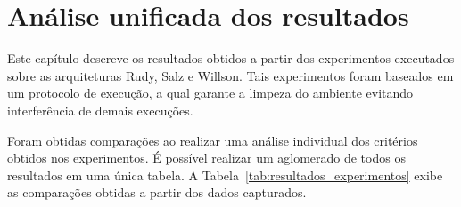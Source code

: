 \section{Análise unificada dos resultados}
\label{sec:experimentos_conc}

Este capítulo descreve os resultados obtidos a partir dos experimentos executados sobre as arquiteturas Rudy, Salz e Willson.
%
Tais experimentos foram baseados em um protocolo de execução, a qual garante a limpeza do ambiente evitando interferência de demais execuções.

Foram obtidas comparações ao realizar uma análise individual dos critérios obtidos nos experimentos.
%
É possível realizar um aglomerado de todos os resultados em uma única tabela.
%
A Tabela~\ref{tab:resultados_experimentos} exibe as comparações obtidas a partir dos dados capturados.

